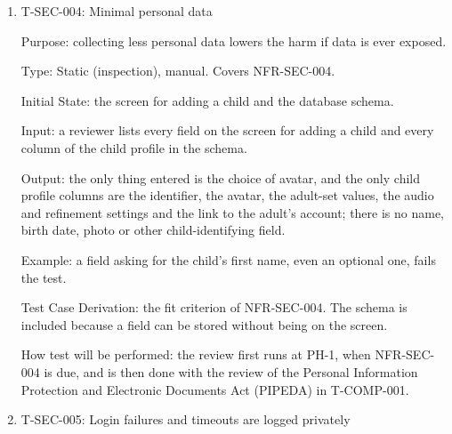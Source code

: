 \documentclass[12pt, titlepage]{article}
\newcommand{\testitem}[1]{\item #1\par\nopagebreak}
\begin{document}
\begin{enumerate}
Purpose: saved attempts are the record the adult relies on; any blocked attempt to change one must be logged.

Type: Dynamic, automatic. Covers NFR-SEC-003.

Initial State: a saved attempt record.

Input: three requests to change the record, sent one after another.

Output: every request is refused, each creates an audit event, and no
event contains the record's contents.

Example: a request to change a saved attempt's result from fail to pass is
refused, and the audit event records the time, the account and the record's
identifier, but not the drawing or the result.

Test Case Derivation: the fit criterion of NFR-SEC-003.

How test will be performed: the script reads the audit log through the
team's database console and checks each event.

\testitem{T-SEC-004: Minimal personal data}

Purpose: collecting less personal data lowers the harm if data is ever exposed.

Type: Static (inspection), manual. Covers NFR-SEC-004.

Initial State: the screen for adding a child and the database schema.

Input: a reviewer lists every field on the screen for adding a child and
every column of the child profile in the schema.

Output: the only thing entered is the choice of avatar, and the
only child profile columns are the identifier, the avatar, the
adult-set values, the audio and refinement settings and the link to the adult's
account; there is no name, birth date, photo or other
child-identifying field.

Example: a field asking for the child's first name, even an optional one,
fails the test.

Test Case Derivation: the fit criterion of NFR-SEC-004. The schema is
included because a field can be stored without being on the screen.

How test will be performed: the review first runs at PH-1, when NFR-SEC-004 is
due, and is then done with the review of the Personal Information
Protection and Electronic Documents Act (PIPEDA) in T-COMP-001.

\testitem{T-SEC-005: Login failures and timeouts are logged privately}


\end{enumerate}
\end{document}

